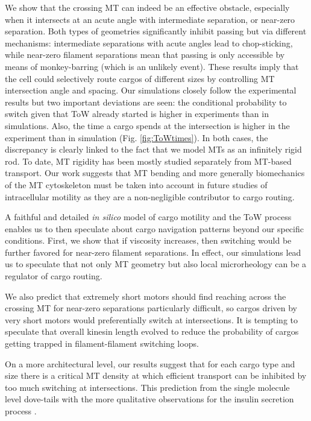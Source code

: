 We show that the crossing MT can indeed be an effective obstacle, especially when it intersects at an acute angle with intermediate separation, or near-zero separation. Both types of geometries significantly inhibit passing but via different mechanisms: intermediate separations with acute angles lead to chop-sticking, while near-zero filament separations mean that passing is only accessible by means of monkey-barring (which is an unlikely event). These results imply that the cell could selectively route cargos of different sizes by controlling MT intersection angle and spacing.
Our simulations closely follow the experimental results but two important deviations are seen: the conditional probability to switch given that ToW already started is higher in experiments than in simulations. Also, the time a cargo spends at the intersection is higher in the experiment than in simulation (Fig. \ref{fig:ToWtimes}). In both cases, the discrepancy is clearly linked to the fact that we model MTs as an infinitely rigid rod. To date, MT rigidity has been mostly studied separately from MT-based transport. Our work suggests that MT bending and more generally biomechanics of the MT cytoskeleton must be taken into account in future studies of intracellular motility as they are a non-negligible contributor to cargo routing.
                      
A faithful and detailed \textit{in silico} model of cargo motility and the ToW process enables us to then speculate about cargo navigation patterns beyond our specific conditions. First, we show that if viscosity increases, then switching would be further favored for near-zero filament separations. In effect, our simulations lead us to speculate that not only MT geometry but also local microrheology can be a regulator of cargo routing.

We also predict that extremely short motors should find reaching across the crossing MT for near-zero separations particularly difficult, so cargos driven by very short motors would preferentially switch at intersections. It is tempting to speculate that overall kinesin length evolved to reduce the probability of cargos getting trapped in filament-filament switching loops.

On a more architectural level, our results suggest that for each cargo type and size there is a critical MT density at which efficient transport can be inhibited by too much switching at intersections. This prediction from the single molecule level dove-tails with the more qualitative observations for the insulin secretion process \cite{Zhu2015}.


